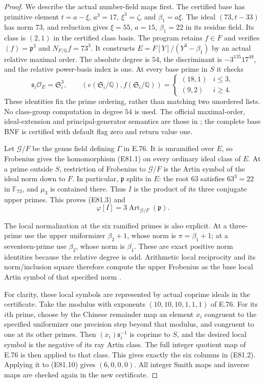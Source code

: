 \begin{proof}
We describe the actual number-field maps first. The
certified base has primitive element $t=a-\xi$,
$a^3=17$, $\xi^3=\zeta$, and $\beta_1=a\xi$.
The ideal $(73,t-33)$ has norm $73$, and reduction gives
$\xi=55$, $a=15$, $\beta_1=22$ in its residue field.
Its class is $(2,1)$ in the certified class basis.
The program retains $f\in F$ and verifies
$(f)=\mathfrak p^3$ and $N_{F/\mathbb Q}f=73^3$.
It constructs $E=F[Y]/(Y^3-\beta_1)$ by an actual
relative maximal order. The absolute degree is $54$,
the discriminant is $-3^{135}17^{48}$, and the relative
power-basis index is one. At every base prime in $S$
it checks
\[
 \mathfrak s_i\mathcal O_E=\mathfrak S_i^{3},
 \qquad
 (e(\mathfrak S_i/\mathbb Q),f(\mathfrak S_i/\mathbb Q))
 =\begin{cases}(18,1)&i\le3,\\(9,2)&i\ge4.
 \end{cases}
 \tag{E81.9}
\]
These identities fix the prime ordering, rather than
matching two unordered lists. No class-group computation
in degree $54$ is used. The official maximal-order,
ideal-extension and principal-generator semantics are
those in \cite{E_PARICertifiedUnits}; the complete base
BNF is certified with default flag zero and return
value one.

Let $\mathcal G/F$ be the genus field defining $\Gamma$
in E.76. It is unramified over $E$, so Frobenius gives
the homomorphism (E81.1) on every ordinary ideal class
of $E$. At a prime outside $S$, restriction of
Frobenius to $\mathcal G/F$ is the Artin symbol of the
ideal norm down to $F$. In particular, $\mathfrak p$
splits in $E$: the root $63$ satisfies $63^3=22$ in
$\mathbb F_{73}$, and $\mu_3$ is contained there.
Thus $I$ is the product of its three conjugate upper
primes. This proves (E81.3) and
\[
             \varphi[I]=3\operatorname{Art}_{\mathcal G/F}
                                      (\mathfrak p).
 \tag{E81.10}
\]

The local normalization at the six ramified primes is
also explicit. At a three-prime use the upper uniformizer
$\beta_2+1$, whose norm is $\pi=\beta_1+1$; at a
seventeen-prime use $\beta_2$, whose norm is $\beta_1$.
These are exact positive norm identities because the
relative degree is odd. Arithmetic local reciprocity
and its norm/inclusion square therefore compute the
upper Frobenius as the base local Artin symbol of that
specified norm \cite[III Theorems~3.1 and~3.4]{E_MilneCFT}.

For clarity, these local symbols are represented by
actual coprime ideals in the certificate. Take the
modulus with exponents $(10,10,10,1,1,1)$ of E.76.
For its $i$th prime, choose by the Chinese remainder
map an element $x_i$ congruent to the specified
uniformizer one precision step beyond that modulus,
and congruent to one at its other primes. Then
$(x_i)\mathfrak s_i^{-1}$ is coprime to $S$, and the
desired local symbol is the negative of its ray Artin
class. The full integer quotient map of E.76 is then
applied to that class. This gives exactly the six
columns in (E81.2). Applying it to (E81.10) gives
$(6,0,0,0)$. All integer Smith maps and inverse maps
are checked again in the new certificate.


\end{proof}
